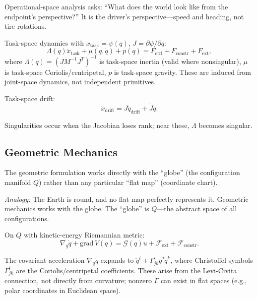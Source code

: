 \documentclass[11pt]{article}
\begin{document}
Operational-space analysis asks: ``What does the world look like from the endpoint's perspective?'' It is the driver's perspective---speed and heading, not tire rotations.

Task-space dynamics with $x_{\mathrm{task}}=\psi(q)$, $J=\partial\psi/\partial q$:
\begin{equation}\label{eq:os-dynamics}
\Lambda(q)\ddot{x}_{\mathrm{task}}+\mu(q,\dot{q})+p(q) = F_{\mathrm{ctrl}}+F_{\mathrm{constr}}+F_{\mathrm{ext}},
\end{equation}
where $\Lambda(q)=(JM^{-1}J^T)^{-1}$ is task-space inertia (valid where nonsingular), $\mu$ is task-space Coriolis/centripetal, $p$ is task-space gravity. These are induced from joint-space dynamics, not independent primitives.

Task-space drift:
\begin{equation}\label{eq:os-drift}
\ddot{x}_{\mathrm{drift}} = J\ddot{q}_{\mathrm{drift}} + \dot{J}\dot{q}.
\end{equation}

Singularities occur when the Jacobian loses rank; near these, $\Lambda$ becomes singular.

\subsection{Geometric Mechanics}\label{sec:geometric}

The geometric formulation works directly with the ``globe'' (the configuration manifold $Q$) rather than any particular ``flat map'' (coordinate chart).

\textit{Analogy:} The Earth is round, and no flat map perfectly represents it. Geometric mechanics works with the globe. The ``globe'' is $Q$---the abstract space of all configurations.

On $Q$ with kinetic-energy Riemannian metric:
\begin{equation}\label{eq:geo-eom}
\nabla_{\dot{q}}\dot{q} + \mathrm{grad}\,V(q) = \mathcal{G}(q)u + \mathcal{F}_{\mathrm{ext}} + \mathcal{F}_{\mathrm{constr}}.
\end{equation}

The covariant acceleration $\nabla_{\dot{q}}\dot{q}$ expands to $\ddot{q}^i + \Gamma^i_{jk}\dot{q}^j\dot{q}^k$, where Christoffel symbols $\Gamma^i_{jk}$ are the Coriolis/centripetal coefficients. These arise from the Levi-Civita connection, not directly from curvature; nonzero $\Gamma$ can exist in flat spaces (e.g., polar coordinates in Euclidean space).
\end{document}
